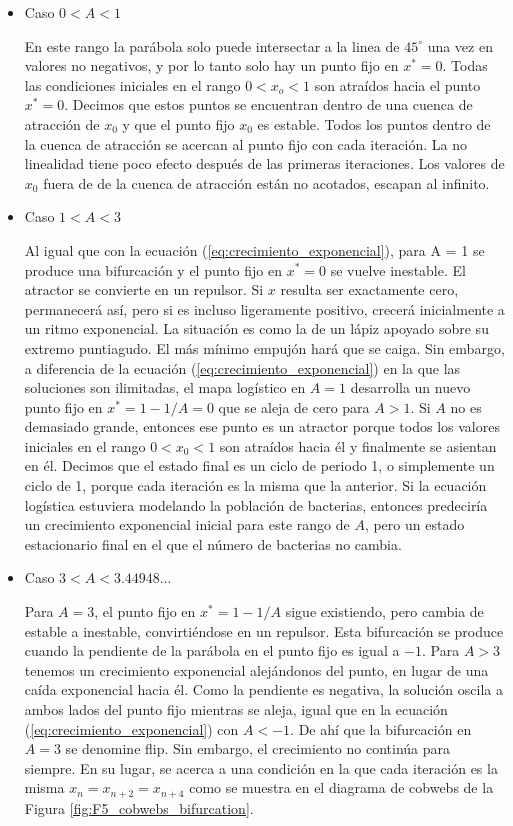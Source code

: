             \begin{itemize}
                \item Caso $0 < A < 1$

                    En este rango la parábola solo puede intersectar a la linea de $45^{\circ}$ una vez en valores no negativos, y por lo tanto solo hay un punto fijo en $x^{*} = 0$. Todas las condiciones iniciales en el rango $0 < x_{o} < 1$ son atraídos hacia el punto $x^{*} = 0$. Decimos que estos puntos se encuentran dentro de una cuenca de atracción de $x_{0}$ y que el punto fijo $x_{0}$ es estable. Todos los puntos dentro de la cuenca de atracción se acercan al punto fijo con cada iteración. La no linealidad tiene poco efecto después de las primeras iteraciones. Los valores de $x_{0}$ fuera de de la cuenca de atracción están no acotados, escapan al infinito.

                \item Caso $1 < A < 3$

                    Al igual que con la ecuación (\ref{eq:crecimiento_exponencial}), para A = 1 se produce una bifurcación y el punto fijo en $x^{*} = 0$ se vuelve inestable. El atractor se convierte en un repulsor. Si $x$ resulta ser exactamente cero, permanecerá así, pero si es incluso ligeramente positivo, crecerá inicialmente a un ritmo exponencial. La situación es como la de un lápiz apoyado sobre su extremo puntiagudo. El más mínimo empujón hará que se caiga. Sin embargo, a diferencia de la ecuación (\ref{eq:crecimiento_exponencial}) en la que las soluciones son ilimitadas, el mapa logístico en $A = 1 $ desarrolla un nuevo punto fijo en $x^{*} = 1- 1/A = 0$ que se aleja de cero para $A > 1$. Si $A$ no es demasiado grande, entonces ese punto es un atractor porque todos los valores iniciales en el rango $0 < x_{0} < 1$ son atraídos hacia él y finalmente se asientan en él. Decimos que el estado final es un ciclo de periodo 1, o simplemente un ciclo de 1, porque cada iteración es la misma que la anterior. Si la ecuación logística estuviera modelando la población de bacterias, entonces predeciría un crecimiento exponencial inicial para este rango de $A$, pero un estado estacionario final en el que el número de bacterias no cambia.

                \item Caso $3 < A < 3.44948\ldots$

                    Para $A = 3$, el punto fijo en $x^{*} = 1 - 1/A$ sigue existiendo, pero cambia de estable a inestable, convirtiéndose en un repulsor. Esta bifurcación se produce cuando la pendiente de la parábola en el punto fijo es igual a $-1$. Para $A > 3$ tenemos un crecimiento exponencial alejándonos del punto, en lugar de una caída exponencial hacia él. Como la pendiente es negativa, la solución oscila a ambos lados del punto fijo mientras se aleja, igual que en la ecuación (\ref{eq:crecimiento_exponencial}) con $ A < -1$. De ahí que la bifurcación en $A = 3$ se denomine flip. Sin embargo, el crecimiento no continúa para siempre. En su lugar, se acerca a una condición en la que cada iteración es la misma $x_{n} = x_{n+2} = x_{n+4}$ como se muestra en el diagrama de cobwebs de la Figura \ref{fig:F5_cobwebs_bifurcation}. 


\end{itemize}
